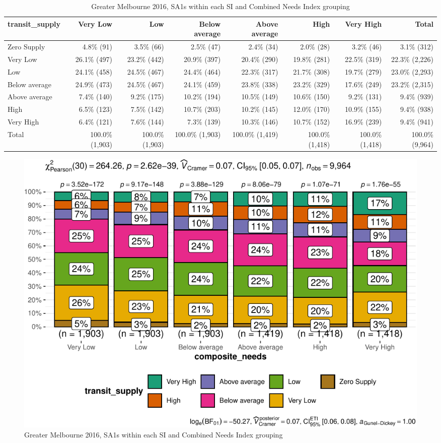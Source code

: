 \documentclass[preprint, 3p,
authoryear]{elsarticle} %
\begin{document}
\begin{longtable}[t]{lrrrrrrr}
\caption{\label{tab:Greater_Melbourne_2016_needs_gap_zones}Greater Melbourne 2016, SA1s within each SI and Combined Needs Index grouping}\\
\toprule
transit\_supply & Very Low & Low & Below average & Above average & High & Very High & Total\\
\midrule
Zero Supply & 4.8\%    (91) & 3.5\%    (66) & 2.5\%    (47) & 2.4\%    (34) & 2.0\%    (28) & 3.2\%    (46) & 3.1\%   (312)\\
Very Low & 26.1\%   (497) & 23.2\%   (442) & 20.9\%   (397) & 20.4\%   (290) & 19.8\%   (281) & 22.5\%   (319) & 22.3\% (2,226)\\
Low & 24.1\%   (458) & 24.5\%   (467) & 24.4\%   (464) & 22.3\%   (317) & 21.7\%   (308) & 19.7\%   (279) & 23.0\% (2,293)\\
Below average & 24.9\%   (473) & 24.5\%   (467) & 24.1\%   (459) & 23.8\%   (338) & 23.2\%   (329) & 17.6\%   (249) & 23.2\% (2,315)\\
Above average & 7.4\%   (140) & 9.2\%   (175) & 10.2\%   (194) & 10.5\%   (149) & 10.6\%   (150) & 9.2\%   (131) & 9.4\%   (939)\\
\addlinespace
High & 6.5\%   (123) & 7.5\%   (142) & 10.7\%   (203) & 10.2\%   (145) & 12.0\%   (170) & 10.9\%   (155) & 9.4\%   (938)\\
Very High & 6.4\%   (121) & 7.6\%   (144) & 7.3\%   (139) & 10.3\%   (146) & 10.7\%   (152) & 16.9\%   (239) & 9.4\%   (941)\\
Total & 100.0\% (1,903) & 100.0\% (1,903) & 100.0\% (1,903) & 100.0\% (1,419) & 100.0\% (1,418) & 100.0\% (1,418) & 100.0\% (9,964)\\
\bottomrule
\end{longtable}
\endgroup{}

\begin{figure}
\centering
\includegraphics{Leveraging_GTFS_to_assess_transit_supply_Transport_Geography_files/figure-latex/Greater_Melbourne_2016_needs_gap_zones-1.pdf}
\caption{Greater Melbourne 2016, SA1s within each SI and Combined Needs
Index grouping}
\end{figure}
\end{document}
